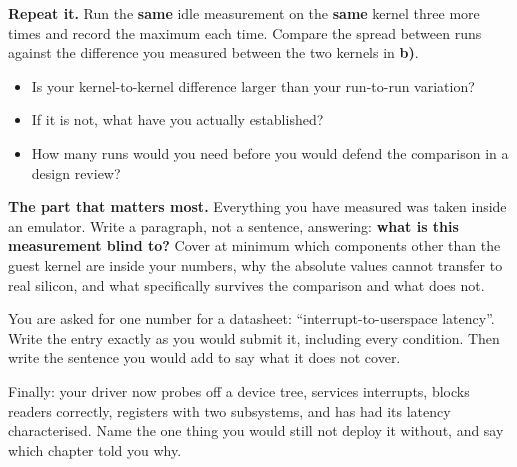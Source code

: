  \textbf{Repeat it.} Run the \textbf{same} idle measurement on the \textbf{same} kernel
three more times and record the maximum each time. Compare the spread between runs against the
difference you measured between the two kernels in \textbf{b)}.
\begin{itemize}
  \item Is your kernel-to-kernel difference larger than your run-to-run variation?
  \item If it is not, what have you actually established?
  \item How many runs would you need before you would defend the comparison in a design review?
\end{itemize}

 \textbf{The part that matters most.} Everything you have measured was taken inside an
emulator. Write a paragraph, not a sentence, answering: \textbf{what is this measurement blind to?}
Cover at minimum which components other than the guest kernel are inside your numbers, why the
absolute values cannot transfer to real silicon, and what specifically survives the comparison and
what does not.

 You are asked for one number for a datasheet: ``interrupt-to-userspace latency''. Write
the entry exactly as you would submit it, including every condition. Then write the sentence you
would add to say what it does not cover.

 Finally: your driver now probes off a device tree, services interrupts, blocks readers
correctly, registers with two subsystems, and has had its latency characterised. Name the one thing
you would still not deploy it without, and say which chapter told you why.
